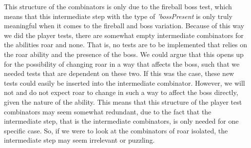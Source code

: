 This structure of the combinators is only due to the fireball boss test, which means that this intermediate step with the type of \textit{'bossPresent} is only truly meaningful when it comes to the fireball and boss variation. Because of this way we did the player tests, there are somewhat empty intermediate combinators for the abilities roar and none. That is, no tests are to be implemented that relies on the roar ability and the presence of the boss. We could argue that this opens up for the possibility of changing roar in a way that affects the boss, such that we needed tests that are dependent on these two. If this was the case, these new tests could easily be inserted into the intermediate combinator. However, we will not and do not expect roar to change in such a way to affect the boss directly, given the nature of the ability. This means that this structure of the player test combinators may seem somewhat redundant, due to the fact that the intermediate step, that is the intermediate combinators, is only needed for one specific case. So, if we were to look at the combinators of roar isolated, the intermediate step may seem irrelevant or puzzling.